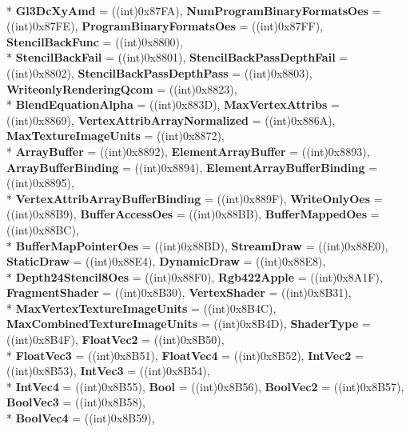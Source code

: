 \begin{DoxyCompactItemize}
\\*
{\bfseries Gl3\-Dc\-Xy\-Amd} = ((int)0x87\-F\-A), 
{\bfseries Num\-Program\-Binary\-Formats\-Oes} = ((int)0x87\-F\-E), 
{\bfseries Program\-Binary\-Formats\-Oes} = ((int)0x87\-F\-F), 
{\bfseries Stencil\-Back\-Func} = ((int)0x8800), 
\\*
{\bfseries Stencil\-Back\-Fail} = ((int)0x8801), 
{\bfseries Stencil\-Back\-Pass\-Depth\-Fail} = ((int)0x8802), 
{\bfseries Stencil\-Back\-Pass\-Depth\-Pass} = ((int)0x8803), 
{\bfseries Writeonly\-Rendering\-Qcom} = ((int)0x8823), 
\\*
{\bfseries Blend\-Equation\-Alpha} = ((int)0x883\-D), 
{\bfseries Max\-Vertex\-Attribs} = ((int)0x8869), 
{\bfseries Vertex\-Attrib\-Array\-Normalized} = ((int)0x886\-A), 
{\bfseries Max\-Texture\-Image\-Units} = ((int)0x8872), 
\\*
{\bfseries Array\-Buffer} = ((int)0x8892), 
{\bfseries Element\-Array\-Buffer} = ((int)0x8893), 
{\bfseries Array\-Buffer\-Binding} = ((int)0x8894), 
{\bfseries Element\-Array\-Buffer\-Binding} = ((int)0x8895), 
\\*
{\bfseries Vertex\-Attrib\-Array\-Buffer\-Binding} = ((int)0x889\-F), 
{\bfseries Write\-Only\-Oes} = ((int)0x88\-B9), 
{\bfseries Buffer\-Access\-Oes} = ((int)0x88\-B\-B), 
{\bfseries Buffer\-Mapped\-Oes} = ((int)0x88\-B\-C), 
\\*
{\bfseries Buffer\-Map\-Pointer\-Oes} = ((int)0x88\-B\-D), 
{\bfseries Stream\-Draw} = ((int)0x88\-E0), 
{\bfseries Static\-Draw} = ((int)0x88\-E4), 
{\bfseries Dynamic\-Draw} = ((int)0x88\-E8), 
\\*
{\bfseries Depth24\-Stencil8\-Oes} = ((int)0x88\-F0), 
{\bfseries Rgb422\-Apple} = ((int)0x8\-A1\-F), 
{\bfseries Fragment\-Shader} = ((int)0x8\-B30), 
{\bfseries Vertex\-Shader} = ((int)0x8\-B31), 
\\*
{\bfseries Max\-Vertex\-Texture\-Image\-Units} = ((int)0x8\-B4\-C), 
{\bfseries Max\-Combined\-Texture\-Image\-Units} = ((int)0x8\-B4\-D), 
{\bfseries Shader\-Type} = ((int)0x8\-B4\-F), 
{\bfseries Float\-Vec2} = ((int)0x8\-B50), 
\\*
{\bfseries Float\-Vec3} = ((int)0x8\-B51), 
{\bfseries Float\-Vec4} = ((int)0x8\-B52), 
{\bfseries Int\-Vec2} = ((int)0x8\-B53), 
{\bfseries Int\-Vec3} = ((int)0x8\-B54), 
\\*
{\bfseries Int\-Vec4} = ((int)0x8\-B55), 
{\bfseries Bool} = ((int)0x8\-B56), 
{\bfseries Bool\-Vec2} = ((int)0x8\-B57), 
{\bfseries Bool\-Vec3} = ((int)0x8\-B58), 
\\*
{\bfseries Bool\-Vec4} = ((int)0x8\-B59), 

\end{DoxyCompactItemize}
